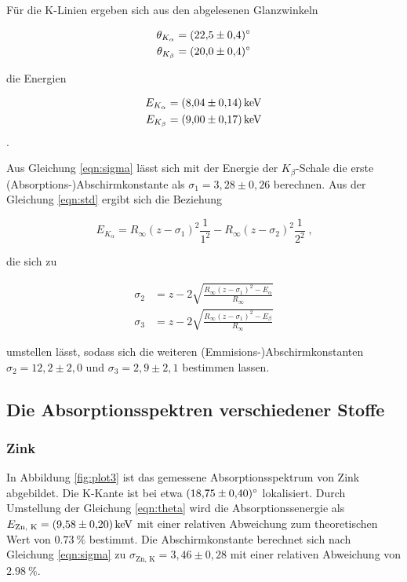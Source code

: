 Für die K-Linien ergeben sich aus den abgelesenen Glanzwinkeln 

\begin{align*}
  \theta_{K_\alpha} &= \SI{22.5 +- 0.4}{\degree} \\
  \theta_{K_\beta} &= \SI{20 +- 0.4}{\degree}
\end{align*}

die Energien 

\begin{align*}
E_{K_\alpha} &= \SI{8.04 +- 0.14}{\kilo\eV} \\
E_{K_\beta} &= \SI{9.00 +- 0.17}{\kilo\eV} 
\end{align*}.

Aus Gleichung \eqref{eqn:sigma} lässt sich mit der Energie der $K_\beta$-Schale
die erste (Absorptions-)Abschirmkonstante als $\sigma_1 = 3,28 \pm 0,26$ berechnen. Aus der Gleichung
\eqref{eqn:std} ergibt sich die Beziehung

\begin{equation}
  E_{K_\alpha} = R_\infty (z - \sigma_1)^2 \frac{1}{1^2} - R_\infty (z - \sigma_2)^2 \frac{1}{2^2}  \; \text{,}
\end{equation}

die sich zu

\begin{align}
  \sigma_2 &= z - 2 \sqrt{\frac{R_\infty (z - \sigma_1)^2 - E_\alpha}{R_\infty}} \\
  \sigma_3 &= z - 2 \sqrt{\frac{R_\infty (z - \sigma_1)^2 - E_\beta}{R_\infty}}
\end{align}

umstellen lässt, sodass sich die weiteren (Emmisions-)Abschirmkonstanten
$\sigma_2 = 12,2 \pm 2,0$ und $\sigma_3 = 2,9 \pm 2,1$ bestimmen lassen.

\subsection{Die Absorptionsspektren verschiedener Stoffe}

\subsubsection{Zink}

In Abbildung \ref{fig:plot3} ist das gemessene Absorptionsspektrum von Zink abgebildet.
Die K-Kante ist bei etwa $\SI{18.75 +- 0.40}{\degree}$ lokalisiert. Durch Umstellung 
der Gleichung \eqref{eqn:theta} wird die Absorptionssenergie als 
$ E_\text{Zn, K} = \SI{9.58 +- 0.20}{\kilo\eV}$ mit einer relativen Abweichung
zum theoretischen Wert von $\SI{0.73}{\percent}$ bestimmt. Die Abschirmkonstante
berechnet sich nach Gleichung \eqref{eqn:sigma} zu $\sigma_\text{Zn, K} = 3,46 \pm 0,28$
mit einer relativen Abweichung von $\SI{2.98}{\percent}$.

